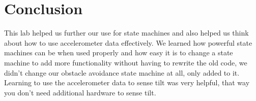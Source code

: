 \documentclass[10pt,titlepage]{article}
\begin{document}
  \section{Conclusion}
    This lab helped us further our use for state machines and also helped us think about how to use accelerometer data effectively. We learned how powerful state machines can be when used properly and how easy it is to change a state machine to add more functionality without having to rewrite the old code, we didn't change our obstacle avoidance state machine at all, only added to it. Learning to use the accelerometer data to sense tilt was very helpful, that way you don't need additional hardware to sense tilt.
\end{document}
